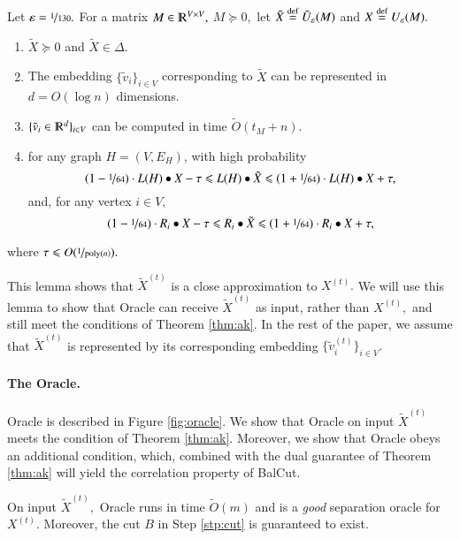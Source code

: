 \documentclass[twoside,leqno,twocolumn]{article}
\newcommand{\nfrac}{\nicefrac}
\renewcommand{\mathbb}{\varmathbb}
\renewcommand{\leq}{\leqslant}
\newcommand{\poly}{\mathrm{poly}}
\newcommand{\defeq}{\stackrel{\textup{def}}{=}}
\newcommand{\R}{\mathbb R}
\newcommand{\e}{\epsilon}
\let\e\varepsilon
\numberwithin{equation}{section}
\begin{document}
\begin{lemma}\label{lem:approx}
Let $\e = \nfrac{1}{130}.$
For a matrix $M \in \R^{V \times V},$ $M \succeq 0,$ let $\tilde{X} \defeq \tilde{U}_\e(M)$ and $X \defeq U_\e(M).$
\begin{enumerate}
\item $\tilde{X} \succeq 0$ and $\tilde{X} \in \Delta.$
\item The embedding $\{\tilde{v}_i\}_{i \in V}$ corresponding to $\tilde{X}$ can be represented in $d=O(\log n)$ dimensions.
\item $\{\tilde{v}_i \in \R^d \}_{i \in V}$ can be computed in time $\tilde{O}(t_M + n).$
\item for any graph $H=(V,E_H)$, with high probability
$$ (1 - \nfrac{1}{64}) \cdot L(H) \bullet X -\tau \leq L(H) \bullet \tilde{X} \leq (1 + \nfrac{1}{64}) \cdot L(H) \bullet X + \tau,$$ and, for any vertex $i \in V,$
$$ (1 - \nfrac{1}{64}) \cdot R_i \bullet X -\tau \leq R_i \bullet \tilde{X} \leq (1 + \nfrac{1}{64}) \cdot R_i \bullet X + \tau,
$$

\end{enumerate}
where $\tau \leq O(\nfrac{1}{\poly(n)}).$
\end{lemma}
This lemma shows that  $\tilde{X}^{(t)}$ is a close approximation to $ X^{(t)}.$ 
We will use this lemma to show that {\sc Oracle}\xspace can receive  $\tilde{X}^{(t)}$ as input, rather than  $X^{(t)},$ and still meet the conditions of Theorem \ref{thm:ak}.
In the rest of the paper, we assume that $\tilde{X}^{(t)}$ is represented by its corresponding embedding $\{\tilde{v}^{(t)}_i\}_{i \in V}.$


\paragraph{The Oracle.} {\sc Oracle}\xspace is described in Figure \ref{fig:oracle}.
 We show that {\sc Oracle}\xspace on input $\tilde{X}^{(t)}$ meets the condition of Theorem \ref{thm:ak}. Moreover, we show that {\sc Oracle}\xspace obeys an additional condition, which, combined with the dual guarantee of Theorem \ref{thm:ak} will yield the correlation property of {\sc BalCut}.
\begin{theorem} \label{thm:oracle}
On input $\tilde{X}^{(t)},$ {\sc Oracle} runs in time $\tilde{O}(m)$ and is a {\it good} separation oracle for $X^{(t)}.$ Moreover, the cut $B$ in Step \ref{stp:cut} is guaranteed to exist.

\end{theorem}
\end{document}
